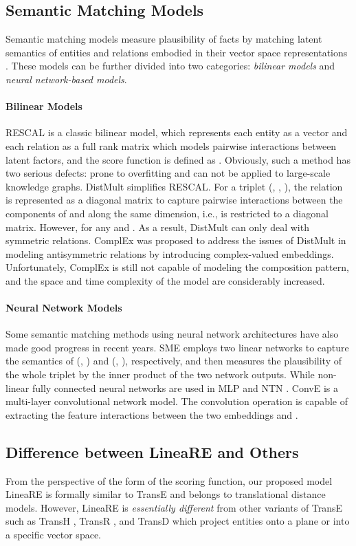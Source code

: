 \documentclass[conference]{IEEEtran}
\begin{document}
\subsection{Semantic Matching Models}
Semantic matching models measure plausibility of facts by matching latent semantics of entities and relations embodied in their vector space representations \cite{Survey}. These models can be further divided into two categories: \textit{bilinear models} and \textit{neural network-based models}.

\paragraph{Bilinear Models}
RESCAL \cite{RESCAL} is a classic bilinear model, which represents each entity as a vector and each relation as a full rank matrix which models pairwise interactions between latent factors, and the score function is defined as . Obviously, such a method has two serious defects: prone to overfitting and can not be applied to large-scale knowledge graphs.
DistMult \cite{DistMult} simplifies RESCAL. For a triplet (, , ), the relation is represented as a diagonal matrix to capture pairwise interactions between the components of  and  along the same dimension, i.e.,  is restricted to a diagonal matrix. However,  for any  and . As a result, DistMult can only deal with symmetric relations. ComplEx \cite{ComplEx} was proposed to address the issues of DistMult in modeling antisymmetric relations by introducing complex-valued embeddings. Unfortunately, ComplEx is still not capable of modeling the composition pattern, and the space and time complexity of the model are considerably increased. 

\paragraph{Neural Network Models}
Some semantic matching methods using neural network architectures have also made good progress in recent years. SME \cite{SME} employs two linear networks to capture the semantics of (, ) and (, ), respectively, and then measures the plausibility of the whole triplet by the inner product of the two network outputs. While non-linear fully connected neural networks are used in MLP \cite{MLP} and NTN \cite{NTN}. ConvE \cite{ConvE} is a multi-layer convolutional network model. The convolution operation is capable of extracting the feature interactions between the two embeddings  and . 

\subsection{Difference between LineaRE and Others}
From the perspective of the form of the scoring function, our proposed model LineaRE is formally similar to TransE and belongs to translational distance models. However, LineaRE is \textit{essentially different} from other variants of TransE such as TransH \cite{TransH}, TransR \cite{TransR}, and TransD \cite{TransD} which project entities onto a plane or into a specific vector space.
\end{document}
